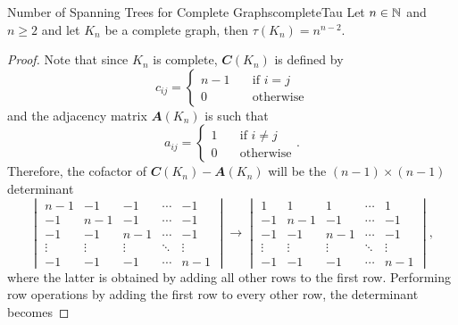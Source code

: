 \documentclass[math]{amznotes}
\theoremstyle{remark}
\begin{document}
\begin{probox}{Number of Spanning Trees for Complete Graphs}{completeTau}
    Let $n \in \mathbb{N}$ and $n \geq 2$ and let $K_n$ be a complete graph, then $\tau(K_n) = n^{n - 2}$.
    \tcblower
    \begin{proof}
        Note that since $K_n$ is complete, $\mathbfit{C}(K_n)$ is defined by
        \begin{equation*}
            c_{ij} = \begin{cases}
                n - 1 & \quad\textrm{if } i = j \\
                0 & \quad\textrm{otherwise}
            \end{cases}
        \end{equation*}
        and the adjacency matrix $\mathbfit{A}(K_n)$ is such that
        \begin{equation*}
            a_{ij} = \begin{cases}
                1 & \quad\textrm{if } i \neq j \\
                0 & \quad\textrm{otherwise}
            \end{cases}.
        \end{equation*}
        Therefore, the cofactor of $\mathbfit{C}(K_n) - \mathbfit{A}(K_n)$ will be the $(n - 1) \times (n - 1)$ determinant
        \begin{equation*}
            \begin{vmatrix}
                n - 1 & -1 & -1 & \cdots & -1 \\
                -1 & n - 1 & -1 & \cdots & -1 \\
                -1 & -1 & n - 1 & \cdots & -1 \\
                \vdots & \vdots & \vdots & \ddots & \vdots \\
                -1 & -1 & -1 & \cdots & n - 1
            \end{vmatrix} \longrightarrow \begin{vmatrix}
                1 & 1 & 1 & \cdots & 1 \\
                -1 & n - 1 & -1 & \cdots & -1 \\
                -1 & -1 & n - 1 & \cdots & -1 \\
                \vdots & \vdots & \vdots & \ddots & \vdots \\
                -1 & -1 & -1 & \cdots & n - 1
            \end{vmatrix},
        \end{equation*}
        where the latter is obtained by adding all other rows to the first row. Performing row operations by adding the first row to every other row, the determinant becomes

\end{proof}
\end{probox}
\end{document}
